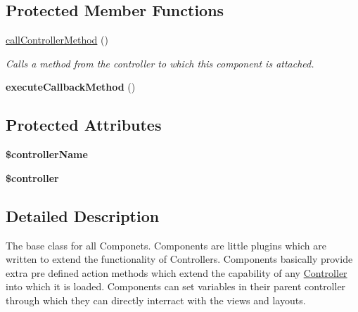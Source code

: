 \subsection*{Protected Member Functions}
\begin{DoxyCompactItemize}
\item 
\hypertarget{class_component_a4205abcc123355ec93c0d2604ad2ad43}{
\hyperlink{class_component_a4205abcc123355ec93c0d2604ad2ad43}{callControllerMethod} ()}
\label{class_component_a4205abcc123355ec93c0d2604ad2ad43}

\begin{DoxyCompactList}\small\item\em Calls a method from the controller to which this component is attached. \item\end{DoxyCompactList}\item 
\hypertarget{class_component_a697ebaef4dfdc27fe7bc9254ee204f5f}{
{\bfseries executeCallbackMethod} ()}
\label{class_component_a697ebaef4dfdc27fe7bc9254ee204f5f}

\end{DoxyCompactItemize}
\subsection*{Protected Attributes}
\begin{DoxyCompactItemize}
\item 
\hypertarget{class_component_ae2ba7a02d2268d5990c65ee375de0d3c}{
{\bfseries \$controllerName}}
\label{class_component_ae2ba7a02d2268d5990c65ee375de0d3c}

\item 
\hypertarget{class_component_a47376cb1869e227b87afbe3b47a3829f}{
{\bfseries \$controller}}
\label{class_component_a47376cb1869e227b87afbe3b47a3829f}

\end{DoxyCompactItemize}


\subsection{Detailed Description}
The base class for all Componets. Components are little plugins which are written to extend the functionality of Controllers. Components basically provide extra pre defined action methods which extend the capability of any \hyperlink{class_controller}{Controller} into which it is loaded. Components can set variables in their parent controller through which they can directly interract with the views and layouts.

